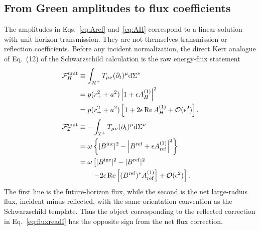 \documentclass[aps,prd,twocolumn,nofootinbib,superscriptaddress,10pt,floatfix]{revtex4-2}
\newcommand{\dd}{\mathrm{d}}
\newcommand{\calO}{\mathcal{O}}
\newcommand{\rp}{r_+}
\newcommand{\Bin}{B^{\rm inc}}
\newcommand{\Bref}{B^{\rm ref}}
\newcommand{\Aref}{A_{\rm ref}^{(1)}}
\newcommand{\AH}{A_H^{(1)}}
\begin{document}
\subsection{From Green amplitudes to flux coefficients}

The amplitudes in Eqs.~\eqref{eq:Aref} and~\eqref{eq:AH} correspond to a
linear solution with unit horizon transmission.  They are not themselves
transmission or reflection coefficients.  Before any incident normalization,
the direct Kerr analogue of Eq.~(12) of the Schwarzschild calculation is the
raw energy-flux statement
\begin{align}
\mathcal{F}_{H}^{\rm unit}
&\equiv
\int_{\mathcal{H}^+}
T_{\mu\nu}(\partial_t)^\mu \dd\Sigma^\nu
\nonumber\\
&=
p(\rp^2+a^2)
\left|1+\epsilon\AH\right|^2
\nonumber\\
&=
p(\rp^2+a^2)
\left[1+2\epsilon\,\mathrm{Re}\,\AH
+\calO(\epsilon^2)\right],
\label{eq:fluxreadH}\\
\mathcal{F}_{\mathcal I}^{\rm unit}
&\equiv
-\int_{\mathcal{I}^+}
T_{\mu\nu}(\partial_t)^\mu \dd\Sigma^\nu
\nonumber\\
&=
\omega\left\{
|\Bin|^2-\left|\Bref+\epsilon\Aref\right|^2
\right\}
\nonumber\\
&=
\omega\left[
|\Bin|^2-|\Bref|^2
\right.
\nonumber\\
&\qquad\left.
-2\epsilon\,\mathrm{Re}\left[(\Bref)^*\Aref\right]
+\calO(\epsilon^2)\right].
\label{eq:fluxreadI}
\end{align}
The first line is the future-horizon flux, while the second is the net
large-radius flux, incident minus reflected, with the same orientation
convention as the Schwarzschild template.  Thus the object corresponding to
the reflected correction in Eq.~\eqref{eq:fluxreadI} has the opposite sign from
the net flux correction.
\end{document}

